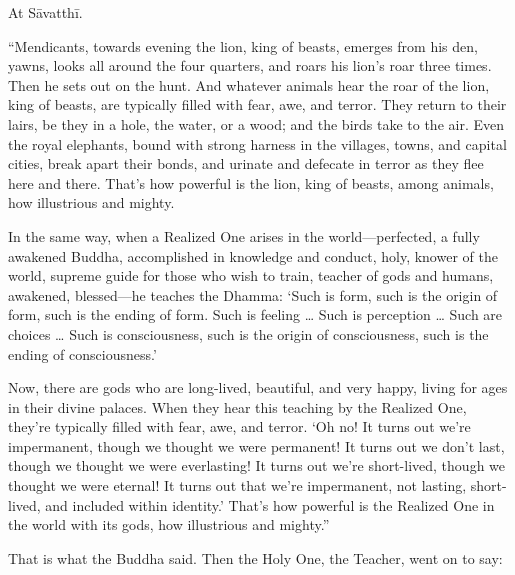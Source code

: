 \documentclass[12pt,openany]{book}%
\begin{document}
At \textsanskrit{Sāvatthī}. 

“Mendicants, towards evening the lion, king of beasts, emerges from his den, yawns, looks all around the four quarters, and roars his lion’s roar three times. Then he sets out on the hunt. And whatever animals hear the roar of the lion, king of beasts, are typically filled with fear, awe, and terror. They return to their lairs, be they in a hole, the water, or a wood; and the birds take to the air. Even the royal elephants, bound with strong harness in the villages, towns, and capital cities, break apart their bonds, and urinate and defecate in terror as they flee here and there. That’s how powerful is the lion, king of beasts, among animals, how illustrious and mighty. 

In the same way, when a Realized One arises in the world—perfected, a fully awakened Buddha, accomplished in knowledge and conduct, holy, knower of the world, supreme guide for those who wish to train, teacher of gods and humans, awakened, blessed—he teaches the Dhamma: ‘Such is form, such is the origin of form, such is the ending of form. Such is feeling … Such is perception … Such are choices … Such is consciousness, such is the origin of consciousness, such is the ending of consciousness.’ 

Now, there are gods who are long-lived, beautiful, and very happy, living for ages in their divine palaces. When they hear this teaching by the Realized One, they’re typically filled with fear, awe, and terror. ‘Oh no! It turns out we’re impermanent, though we thought we were permanent! It turns out we don’t last, though we thought we were everlasting! It turns out we’re short-lived, though we thought we were eternal! It turns out that we’re impermanent, not lasting, short-lived, and included within identity.’ That’s how powerful is the Realized One in the world with its gods, how illustrious and mighty.” 

That is what the Buddha said. Then the Holy One, the Teacher, went on to say: 
\end{document}
